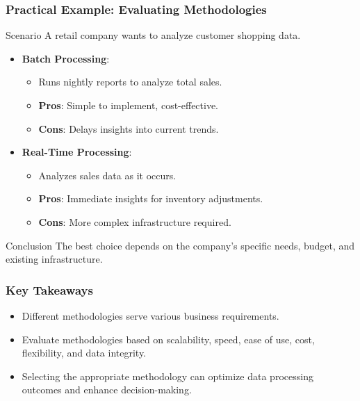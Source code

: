 \documentclass[aspectratio=169]{beamer}
\begin{document}
\begin{frame}[fragile]
    \frametitle{Practical Example: Evaluating Methodologies}
    \begin{block}{Scenario}
        A retail company wants to analyze customer shopping data.
    \end{block}
    \begin{itemize}
        \item \textbf{Batch Processing}: 
            \begin{itemize}
                \item Runs nightly reports to analyze total sales.
                \item \textbf{Pros}: Simple to implement, cost-effective.
                \item \textbf{Cons}: Delays insights into current trends.
            \end{itemize}
        
        \item \textbf{Real-Time Processing}: 
            \begin{itemize}
                \item Analyzes sales data as it occurs.
                \item \textbf{Pros}: Immediate insights for inventory adjustments.
                \item \textbf{Cons}: More complex infrastructure required.
            \end{itemize}
    \end{itemize}
    \begin{block}{Conclusion}
        The best choice depends on the company’s specific needs, budget, and existing infrastructure.
    \end{block}
\end{frame}

\begin{frame}[fragile]
    \frametitle{Key Takeaways}
    \begin{itemize}
        \item Different methodologies serve various business requirements.
        \item Evaluate methodologies based on scalability, speed, ease of use, cost, flexibility, and data integrity.
        \item Selecting the appropriate methodology can optimize data processing outcomes and enhance decision-making.
    \end{itemize}
\end{frame}
\end{document}
